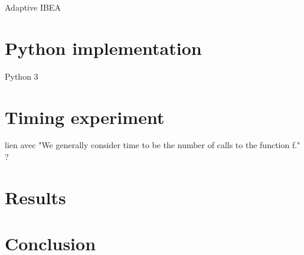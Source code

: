 \documentclass[12pt]{article}
\begin{document}
\begin{algorithm}
\caption{Adaptive IBEA}
\begin{algorithmic}[1]

\EndProcedure
{}

\EndProcedure
\end{algorithmic}
\end{algorithm}

\section{Python implementation}

Python 3

\section{Timing experiment}
lien avec "We generally consider time to be the number of calls to the function f." ?

\section{Results}

\section{Conclusion}
\end{document}
